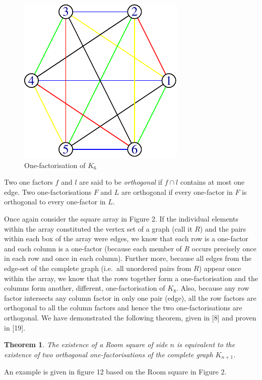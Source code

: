 \documentclass[
  12pt,
  a4paper]{book}
\newtheorem{theorem}{Theorem}
\begin{document}
\begin{figure}
\centering
\includegraphics{figure/one-factorisation-1.pdf}
\caption{\label{fig:one-factorisation}One-factorisation of \(K_6\)}
\end{figure}

Two one factors \(f\) and \(l\) are said to be \emph{orthogonal} if
\(f \cap l\) contains at most one edge. Two one-factorisations \(F\) and \(L\)
are orthogonal if every one-factor in \(F\) is orthogonal to every
one-factor in \(L\).

Once again consider the square array in Figure 2. If the individual
elements within the array constituted the vertex set of a graph (call it
\(R\)) and the pairs within each box of the array were edges, we know that
each row is a one-factor and each column is a one-factor (because each
member of \(R\) occurs precisely once in each row and once in each
column). Further more, because all edges from the edge-set of the
complete graph (i.e.~all unordered pairs from \(R\)) appear once within
the array, we know that the rows together form a one-factorisation and
the columns form another, different, one-factorisation of \(K_8\). Also,
because any row factor intersects any column factor in only one pair
(edge), all the row factors are orthogonal to all the column factors and
hence the two one-factorisations are orthogonal. We have demonstrated
the following theorem, given in {[}8{]} and proven in {[}19{]}.

\begin{theorem}
The existence of a Room square of side
$n$
is equivalent to the existence of two orthogonal
one-factorisations of the complete graph
$K_{n+1}$.
\end{theorem}

An example is given in figure 12 based on the Room square in Figure 2.
\end{document}
